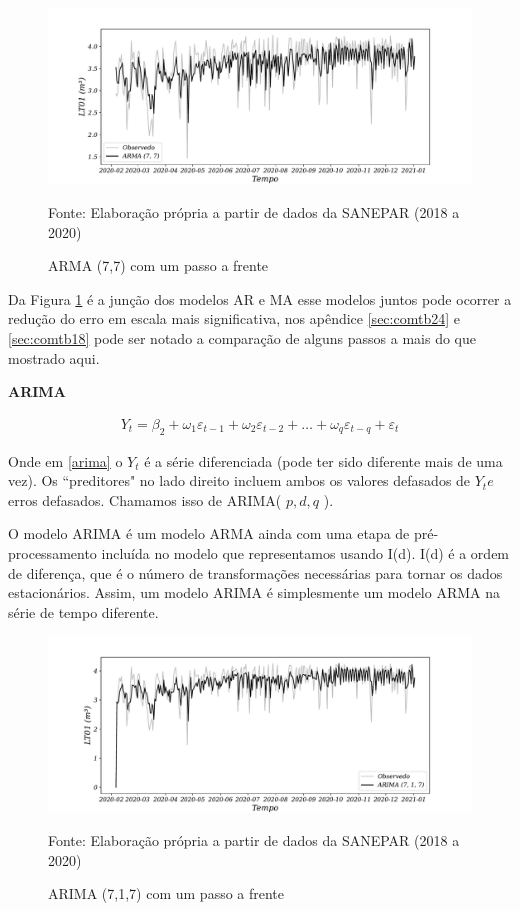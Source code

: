 \begin{figure}[H]
	\centering
	\caption{ARMA (7,7) com um passo a frente}
	\label{fig:1-arma}
	\includegraphics[width=1\linewidth]{Modelos/Figuras/1-ARMA}
	
	Fonte: Elaboração própria a partir de dados da SANEPAR (2018 a 2020)
\end{figure}

Da Figura \ref{fig:1-arma} é a junção dos modelos AR e MA esse modelos juntos pode ocorrer a redução do erro em escala mais significativa, nos apêndice \ref{sec:comtb24} e \ref{sec:comtb18} pode ser notado a comparação de alguns passos a mais do que mostrado aqui.

\textbf{ARIMA}

\begin{eqnarray}
	Y_t = \beta_2 + \omega_1\varepsilon_{t-1} + \omega_2 \varepsilon_{t-2} +\ldots+ \omega_q \varepsilon_{t-q} + \varepsilon_t \label{arima}
\end{eqnarray}


Onde em \eqref{arima} o $Y_t$ é a série diferenciada (pode ter sido diferente mais de uma vez). Os ``preditores" no lado direito incluem ambos os valores defasados de $Y_t e$ erros defasados. Chamamos isso de ARIMA( $p, d, q$ ).

O modelo ARIMA é um modelo ARMA ainda com uma etapa de pré-processamento incluída no modelo que representamos usando I(d). I(d) é a ordem de diferença, que é o número de transformações necessárias para tornar os dados estacionários. Assim, um modelo ARIMA é simplesmente um modelo ARMA na série de tempo diferente.

\begin{figure}[H]
	\centering
	\caption{ARIMA (7,1,7) com um passo a frente}
	\label{fig:1-arima}
	\includegraphics[width=1\linewidth]{Modelos/Figuras/1-ARIMA}
	
	Fonte: Elaboração própria a partir de dados da SANEPAR (2018 a 2020)
\end{figure}

